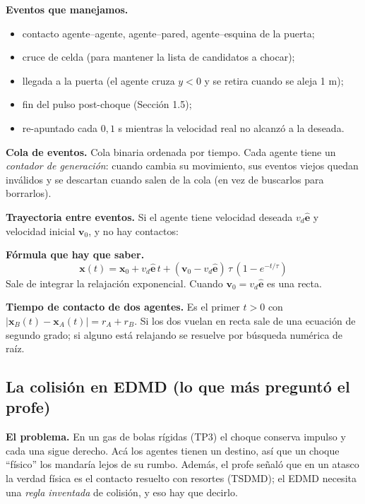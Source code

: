 \documentclass[10.5pt,a4paper]{article}
\newcommand{\vect}[1]{\mathbf{#1}}
\newcommand{\formula}[1]{\par\colorbox{fml}{\parbox{\dimexpr\linewidth-2\fboxsep}{\textbf{Fórmula que hay que saber.} #1}}\par}
\begin{document}
\textbf{Eventos que manejamos.}
\begin{itemize}
\item contacto agente--agente, agente--pared, agente--esquina de la puerta;
\item cruce de celda (para mantener la lista de candidatos a chocar);
\item llegada a la puerta (el agente cruza $y<0$ y se retira cuando se aleja 1 m);
\item fin del pulso post-choque (Sección 1.5);
\item re-apuntado cada $0{,}1$ s mientras la velocidad real no alcanzó a la deseada.
\end{itemize}
\textbf{Cola de eventos.} Cola binaria ordenada por tiempo. Cada agente tiene un \emph{contador de generación}: cuando cambia su movimiento, sus eventos viejos quedan inválidos y se descartan cuando salen de la cola (en vez de buscarlos para borrarlos).

\textbf{Trayectoria entre eventos.} Si el agente tiene velocidad deseada $v_d\hat{\vect e}$ y velocidad inicial $\vect v_0$, y no hay contactos:
\formula{
\[
\vect x(t)=\vect x_0+v_d\hat{\vect e}\,t+(\vect v_0-v_d\hat{\vect e})\,\tau\,(1-e^{-t/\tau})
\]
Sale de integrar la relajación exponencial. Cuando $\vect v_0=v_d\hat{\vect e}$ es una recta.}
\textbf{Tiempo de contacto de dos agentes.} Es el primer $t>0$ con $|\vect x_B(t)-\vect x_A(t)|=r_A+r_B$. Si los dos vuelan en recta sale de una ecuación de segundo grado; si alguno está relajando se resuelve por búsqueda numérica de raíz.

\subsection{La colisión en EDMD (lo que más preguntó el profe)}
\textbf{El problema.} En un gas de bolas rígidas (TP3) el choque conserva impulso y cada una sigue derecho. Acá los agentes tienen un destino, así que un choque ``físico'' los mandaría lejos de su rumbo. Además, el profe señaló que en un atasco la verdad física es el contacto resuelto con resortes (TSDMD); el EDMD necesita una \emph{regla inventada} de colisión, y eso hay que decirlo.
\end{document}
